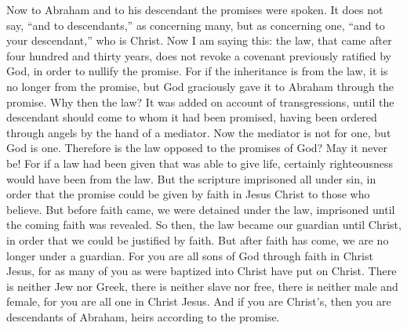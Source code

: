 \begin{biblechapter}
\verse Now to Abraham and to his descendant the promises were spoken. It does not say, “and to descendants,” as concerning many, but as concerning one, “and to your descendant,” who is Christ.
\verse Now I am saying this: the law, that came after four hundred and thirty years, does not revoke a covenant previously ratified by God, in order to nullify the promise.
\verse For if the inheritance is from the law, it is no longer from the promise, but God graciously gave it to Abraham through the promise.
 Why then the law? It was added on account of transgressions, until the descendant should come to whom it had been promised, having been ordered through angels by the hand of a mediator.
\verse Now the mediator is not for one, but God is one.
\verse Therefore is the law opposed to the promises of God? May it never be! For if a law had been given that was able to give life, certainly righteousness would have been from the law.
\verse But the scripture imprisoned all under sin, in order that the promise could be given by faith in Jesus Christ to those who believe.
\verse But before faith came, we were detained under the law, imprisoned until the coming faith was revealed.
\verse So then, the law became our guardian until Christ, in order that we could be justified by faith.
\verse But after faith has come, we are no longer under a guardian.
\verse For you are all sons of God through faith in Christ Jesus,
\verse for as many of you as were baptized into Christ have put on Christ.
\verse There is neither Jew nor Greek, there is neither slave nor free, there is neither male and female, for you are all one in Christ Jesus.
\verse And if you are Christ’s, then you are descendants of Abraham, heirs according to the promise.
\end{biblechapter}

